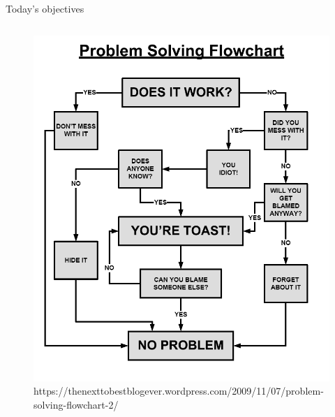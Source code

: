 \documentclass[mathserif, aspectratio=169]{beamer}
\begin{document}
\begin{frame}{Today's objectives}
\begin{columns}
\vspace{-10mm}
\begin{figure}
\includegraphics[width=\textwidth]{decision_tree}
\caption*{\footnotesize https://thenexttobestblogever.wordpress.com/2009/11/07/problem-solving-flowchart-2/}
\end{figure}
\end{columns}
\end{frame}
\end{document}
